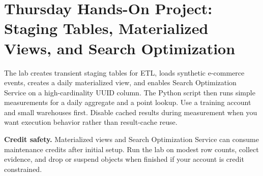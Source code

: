 \section{Thursday Hands-On Project: Staging Tables, Materialized Views, and Search Optimization}
The lab creates transient staging tables for ETL, loads synthetic e-commerce events, creates a daily materialized view, and enables Search Optimization Service on a high-cardinality UUID column. The Python script then runs simple measurements for a daily aggregate and a point lookup. Use a training account and small warehouses first. Disable cached results during measurement when you want execution behavior rather than result-cache reuse.
\begin{pitfall}
\textbf{Credit safety.} Materialized views and Search Optimization Service can consume maintenance credits after initial setup. Run the lab on modest row counts, collect evidence, and drop or suspend objects when finished if your account is credit constrained.
\end{pitfall}
